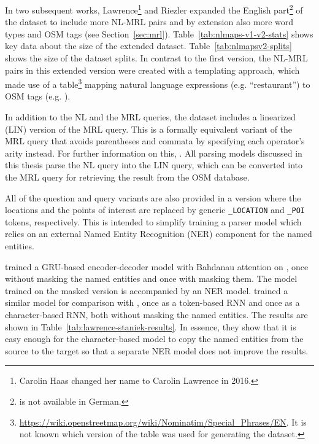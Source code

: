 In two subsequent works, Lawrence\footnote{Carolin Haas changed her name to
  Carolin Lawrence in 2016.} and Riezler
\parencites*{lawrence-2016}{lawrence-2018} expanded the English
part\footnote{\nlmapstwo{} is not available in German.} of the dataset to
include more NL-MRL pairs and by extension also more word types and OSM tags
(see Section~\ref{sec:mrl}). Table~\ref{tab:nlmaps-v1-v2-stats} shows key data
about the size of the extended dataset. Table~\ref{tab:nlmapsv2-splits} shows
the size of the dataset splits. In contrast to the first version, the NL-MRL
pairs in this extended version were created with a templating approach, which
made use of a
table\footnote{\url{https://wiki.openstreetmap.org/wiki/Nominatim/Special_Phrases/EN}.
  It is not known which version of the table was used for generating the
  \nlmapstwo{} dataset.} mapping natural language expressions (e.g.
“restaurant”) to OSM tags (e.g. ).

In addition to the NL and the MRL queries, the dataset includes a linearized
(LIN) version of the MRL query. This is a formally equivalent variant of the MRL
query that avoids parentheses and commata by specifying each operator’s arity
instead. For further information on this,
\textcites(cf.)(){andreas-2013}{haas-2016}. All parsing models discussed in this
thesis parse the NL query into the LIN query, which can be converted into the
MRL query for retrieving the result from the OSM database.

All of the question and query variants are also provided in a version where the
locations and the points of interest are replaced by generic
\lstinline!_LOCATION! and \lstinline!_POI! tokens, respectively. This is
intended to simplify training a parser model which relies on an external Named
Entity Recognition (NER) component for the named entities.

\textcite{lawrence-2018} trained a GRU-based encoder-decoder model
\parencite{cho-2014} with Bahdanau attention \parencite{bahdanau-2015} on
\nlmapstwo{}, once without masking the named entities and once with masking
them. The model trained on the masked version is accompanied by an NER model.
\textcite{staniek-2020} trained a similar model for comparison with
\textcite{lawrence-2018}, once as a token-based RNN and once as a
character-based RNN, both without masking the named entities. The results are
shown in Table~\ref{tab:lawrence-staniek-results}. In essence, they show that it
is easy enough for the character-based model to copy the named entities from the
source to the target so that a separate NER model does not improve the results.


